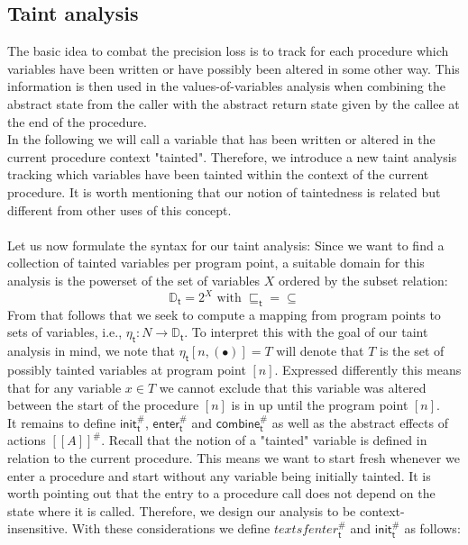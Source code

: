     \subsection{Taint analysis}\label{section:formalTaint}
      The basic idea to combat the precision loss is to track for each procedure which variables have been written or have possibly been altered in some other way. This information is then used in the values-of-variables analysis when combining the abstract state from the caller with the abstract return state given by the callee at the end of the procedure.\\
      In the following we will call a variable that has been written or altered in the current procedure context "tainted". Therefore, we introduce a new taint analysis tracking which variables have been tainted within the context of the current procedure. It is worth mentioning that our notion of taintedness is related but different from other uses of this concept.\\
      \\
      Let us now formulate the syntax for our taint analysis:
      Since we want to find a collection of tainted variables per program point, a suitable domain for this analysis is the powerset of the set of variables $X$ ordered by the subset relation:
      \[\mathbb{D}_\textsf{t} = 2^X \text{ with } \sqsubseteq_\textsf{t} = \subseteq\]
      From that follows that we seek to compute a mapping from program points to sets of variables, i.e., $\eta_\textsf{t}: N \rightarrow \mathbb{D}_\textsf{t}$. To interpret this with the goal of our taint analysis in mind, we note that $\eta_\textsf{t} [n, (\bullet)] = T$ will denote that $T$ is the set of possibly tainted variables at program point $[n]$. Expressed differently this means that for any variable $x \in T$ we cannot exclude that this variable was altered between the start of the procedure $[n]$ is in up until the program point $[n]$.\\
      It remains to define $\textsf{init}^{\#}_\textsf{t}$, $\textsf{enter}^{\#}_\textsf{t}$ and $\textsf{combine}^{\#}_\textsf{t}$ as well as the abstract effects of actions $[\![ A ]\!]^{\#}$. Recall that the notion of a "tainted" variable is defined in relation to the current procedure. This means we want to start fresh whenever we enter a procedure and start without any variable being initially tainted. It is worth pointing out that the entry to a procedure call does not depend on the state where it is called. Therefore, we design our analysis to be context-insensitive. With these considerations we define $textsf{enter}^{\#}_\textsf{t}$ and $\textsf{init}^{\#}_\textsf{t}$ as follows:
